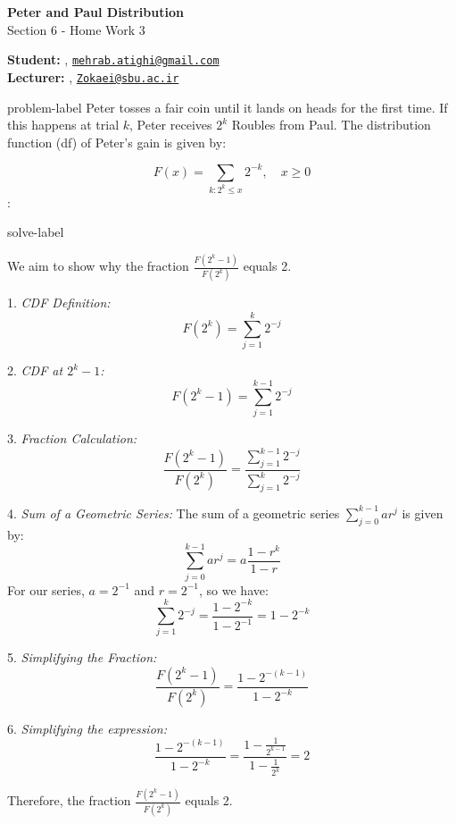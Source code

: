 	






		\begin{Large}
		\textsf{\textbf{Peter and Paul Distribution}}\\
		Section 6 - Home Work 3
	\end{Large}
	
	\vspace{1ex}
	
	\textsf{\textbf{Student:}} , \href{mailto:mehrab.atighi@gmail.com}{\texttt{mehrab.atighi@gmail.com}}\\
	\textsf{\textbf{Lecturer:}} , \href{mailto:Zokaei@sbu.ac.ir}{\texttt{Zokaei@sbu.ac.ir}}
	
	
	\vspace{2ex}
	
	\begin{problem}{}{problem-label}
		Peter tosses a fair coin until it lands on heads for the first time. If this happens at trial \( k \), Peter receives \( 2^k \) Roubles from Paul. The distribution function (df) of Peter's gain is given by:
		
		\[
		F(x) = \sum_{k: 2^k \leq x} 2^{-k}, \quad x \geq 0
		\]
		\cite{Embrechts.etal1997}:
	\end{problem}
	
	\begin{solve}{}{solve-label}

We aim to show why the fraction \( \frac{F(2^k - 1)}{F(2^k)} \) equals 2.

1. \textit{CDF Definition:}
\[
F(2^k) = \sum_{j=1}^{k} 2^{-j}
\]

2. \textit{CDF at \(2^k - 1\):}
\[
F(2^k - 1) = \sum_{j=1}^{k-1} 2^{-j}
\]

3. \textit{Fraction Calculation:}
\[
\frac{F(2^k - 1)}{F(2^k)} = \frac{\sum_{j=1}^{k-1} 2^{-j}}{\sum_{j=1}^{k} 2^{-j}}
\]

4. \textit{Sum of a Geometric Series:}
The sum of a geometric series \( \sum_{j=0}^{k-1} ar^j \) is given by:
\[
\sum_{j=0}^{k-1} ar^j = a \frac{1-r^k}{1-r}
\]
For our series, \( a = 2^{-1} \) and \( r = 2^{-1} \), so we have:
\[
\sum_{j=1}^{k} 2^{-j} = \frac{1 - 2^{-k}}{1 - 2^{-1}} = 1 - 2^{-k}
\]

5. \textit{Simplifying the Fraction:}
\[
\frac{F(2^k - 1)}{F(2^k)} = \frac{1 - 2^{-(k-1)}}{1 - 2^{-k}}
\]

6. \textit{Simplifying the expression:}
\[
\frac{1 - 2^{-(k-1)}}{1 - 2^{-k}} = \frac{1 - \frac{1}{2^{k-1}}}{1 - \frac{1}{2^k}} = 2
\]

Therefore, the fraction \( \frac{F(2^k - 1)}{F(2^k)} \) equals 2.\\
\cite{r1,r2,r3,r4}
	\end{solve}
	
	
	
	
	
